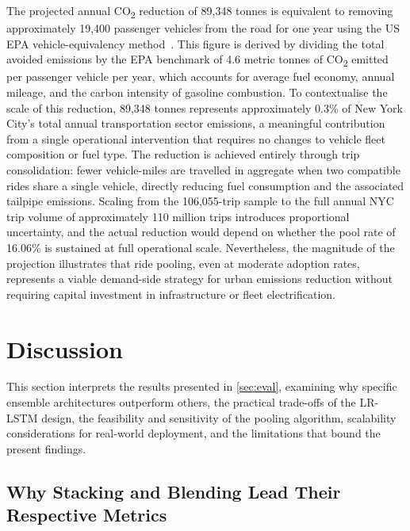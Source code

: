 \documentclass[a4paper,fleqn]{cas-dc}
\begin{document}
The projected annual CO\textsubscript{2} reduction of 89,348 tonnes is equivalent to removing approximately 19,400 passenger vehicles from the road for one year using the US EPA vehicle-equivalency method~\cite{epa_equivalencies}.  This figure is derived by dividing the total avoided emissions by the EPA benchmark of 4.6 metric tonnes of CO\textsubscript{2} emitted per passenger vehicle per year, which accounts for average fuel economy, annual mileage, and the carbon intensity of gasoline combustion.  To contextualise the scale of this reduction, 89,348 tonnes represents approximately 0.3\% of New York City's total annual transportation sector emissions, a meaningful contribution from a single operational intervention that requires no changes to vehicle fleet composition or fuel type.  The reduction is achieved entirely through trip consolidation: fewer vehicle-miles are travelled in aggregate when two compatible rides share a single vehicle, directly reducing fuel consumption and the associated tailpipe emissions.  Scaling from the 106,055-trip sample to the full annual NYC trip volume of approximately 110 million trips introduces proportional uncertainty, and the actual reduction would depend on whether the pool rate of 16.06\% is sustained at full operational scale.  Nevertheless, the magnitude of the projection illustrates that ride pooling, even at moderate adoption rates, represents a viable demand-side strategy for urban emissions reduction without requiring capital investment in infrastructure or fleet electrification.

\section{Discussion}
\label{sec:discussion}

This section interprets the results presented in \autoref{sec:eval}, examining why specific ensemble architectures outperform others, the practical trade-offs of the LR-LSTM design, the feasibility and sensitivity of the pooling algorithm, scalability considerations for real-world deployment, and the limitations that bound the present findings.

\subsection{Why Stacking and Blending Lead Their Respective Metrics}
\end{document}
